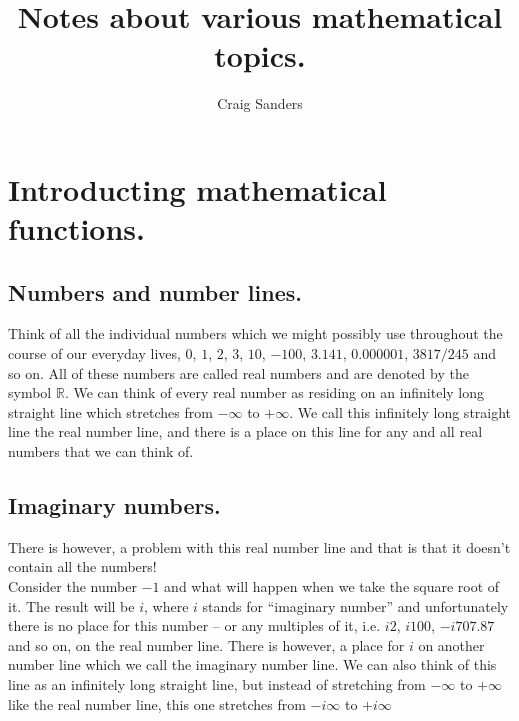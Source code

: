 \documentclass{article}
\title{Notes about various mathematical topics.}
\author{Craig Sanders}
\date{ }
\begin{document}
\newpage

\maketitle

\newpage

\tableofcontents

\newpage

\listoffigures


\newpage

\section{Introducting mathematical functions.}

\subsection{Numbers and number lines.}

Think of all the individual numbers which we might possibly use throughout the course of our everyday lives, $0$, $1$, $2$, 
$3$, $10$, $-100$, $3.141$, $0.000001$, $3817/245$ and so on. All of these numbers are called real numbers and
are denoted by the symbol $\mathbb{R}$.
We can think of every real number as residing on an infinitely long straight line which stretches from
$-\infty$ to $+\infty$. We call this infinitely long straight line the real number line, and there is a place on this
line for any and all real numbers that we can think of.


\subsection{Imaginary numbers.}

There is however, a problem with this real number line and that is that it doesn't contain all the numbers!\\ 

Consider the number $-1$ and what will happen when we take the square root of it. The result will be $i$, where 
$i$ stands for ``imaginary number'' and unfortunately there is no place for this number -- or any multiples of it,
i.e. $i2$, $i100$, $-i707.87$ and so on, on the real number line. There is however, a place for $i$ on another
number line which we call the imaginary number line. We can also think
of this line as an infinitely long straight line, but instead of stretching from $-\infty$ to $+\infty$ like the real
number line, this one stretches from $-i\infty$ to $+i\infty$
\end{document}
